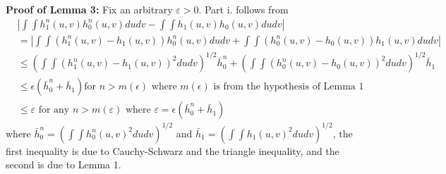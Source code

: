\documentclass[12pt]{article}
\theoremstyle{definition}
\begin{document}
\begin{flushleft}
\textbf{Proof of Lemma 3:} Fix an arbitrary $\varepsilon > 0$. Part i. follows from
\begin{align*}
&\left|\int\int h^{n}_{1}(u,v)h^{n}_{0}(u,v)dudv -  \int\int h_{1}(u,v)h_{0}(u,v)dudv\right| \\
&= \left|\int\int \left(h^{n}_{1}(u,v)-h_{1}(u,v)\right)h^{n}_{0}(u,v)dudv + \int\int \left(h^{n}_{0}(u,v)-h_{0}(u,v)\right)h_{1}(u,v)dudv\right| \\
&\leq \left(\int\int \left(h^{n}_{1}(u,v)-h_{1}(u,v)\right)^{2}dudv\right)^{1/2}\bar{h}^{n}_{0} + \left(\int\int \left(h^{n}_{0}(u,v)-h_{0}(u,v)\right)^{2}dudv\right)^{1/2}\bar{h}_{1} \\
  &\leq \epsilon \left(\bar{h}^{n}_{0} + \bar{h}_{1}\right) \text{for $n > m(\epsilon)$ where $m(\epsilon)$ is from the hypothesis of Lemma 1}\\
 &\leq \varepsilon \text{ for any $n > m\left(\varepsilon\right)$ where $\varepsilon = \epsilon(\bar{h}^{n}_{0} + \bar{h}_{1})$}
\end{align*}
where $\bar{h}^{n}_{0} = \left(\int\int h^{n}_{0}(u,v)^{2}dudv\right)^{1/2}$ and $\bar{h}_{1} = \left(\int\int h_{1}(u,v)^{2}dudv\right)^{1/2}$, the first inequality is due to Cauchy-Schwarz and the triangle inequality, and the second is due to Lemma 1. \newline


\end{flushleft}
\end{document}

